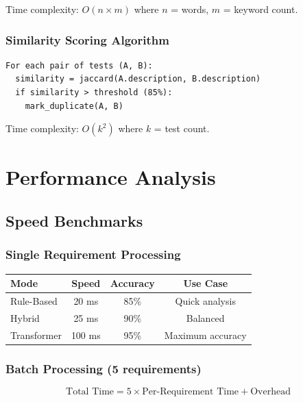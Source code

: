 \documentclass[12pt,oneside]{report}
\begin{document}
Time complexity: $O(n \times m)$ where $n$ = words, $m$ = keyword count.

\subsection{Similarity Scoring Algorithm}

\begin{verbatim}
For each pair of tests (A, B):
  similarity = jaccard(A.description, B.description)
  if similarity > threshold (85%):
    mark_duplicate(A, B)
\end{verbatim}

Time complexity: $O(k^2)$ where $k$ = test count.


\chapter{Performance Analysis}

\section{Speed Benchmarks}

\subsection{Single Requirement Processing}

\begin{table}[H]
\centering
\begin{tabular}{|l|c|c|c|}
\hline
\textbf{Mode} & \textbf{Speed} & \textbf{Accuracy} & \textbf{Use Case} \\
\hline
Rule-Based & 20 ms & 85\% & Quick analysis \\
Hybrid & 25 ms & 90\% & Balanced \\
Transformer & 100 ms & 95\% & Maximum accuracy \\
\hline
\end{tabular}
\end{table}

\subsection{Batch Processing (5 requirements)}

\begin{equation}
\text{Total Time} = 5 \times \text{Per-Requirement Time} + \text{Overhead}
\end{equation}
\end{document}
